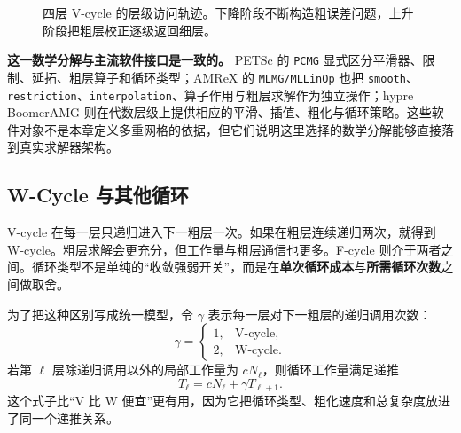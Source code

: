 \begin{figure}[htbp]
\centering
{}
\caption{四层 V-cycle 的层级访问轨迹。下降阶段不断构造粗误差问题，上升阶段把粗层校正逐级返回细层。}
\label{fig:mg-vcycle-path}
\end{figure}

\begin{engineeringbox}
\textbf{这一数学分解与主流软件接口是一致的。}
PETSc 的 \texttt{PCMG} 显式区分平滑器、限制、延拓、粗层算子和循环类型；AMReX 的 \texttt{MLMG/MLLinOp} 也把 \texttt{smooth}、\texttt{restriction}、\texttt{interpolation}、算子作用与粗层求解作为独立操作；hypre BoomerAMG 则在代数层级上提供相应的平滑、插值、粗化与循环策略\cite{petscPCMG2026,amrexMLMGdocs2026,hypreBoomer2026}。这些软件对象不是本章定义多重网格的依据，但它们说明这里选择的数学分解能够直接落到真实求解器架构。
\end{engineeringbox}

\subsection{W-Cycle 与其他循环}

V-cycle 在每一层只递归进入下一粗层一次。如果在粗层连续递归两次，就得到 W-cycle。粗层求解会更充分，但工作量与粗层通信也更多。F-cycle 则介于两者之间。循环类型不是单纯的“收敛强弱开关”，而是在\textbf{单次循环成本}与\textbf{所需循环次数}之间做取舍。

为了把这种区别写成统一模型，令 $\gamma$ 表示每一层对下一粗层的递归调用次数：
\begin{equation}
\gamma=
\begin{cases}
1,&\text{V-cycle},\\
2,&\text{W-cycle}.
\end{cases}
\label{eq:mg-gamma-cycle-definition}
\end{equation}
若第 $\ell$ 层除递归调用以外的局部工作量为 $cN_\ell$，则循环工作量满足递推
\begin{equation}
\boxed{
T_\ell
=
cN_\ell+\gamma T_{\ell+1}.
}
\label{eq:mg-gamma-cycle-recurrence}
\end{equation}
这个式子比“V 比 W 便宜”更有用，因为它把循环类型、粗化速度和总复杂度放进了同一个递推关系。


